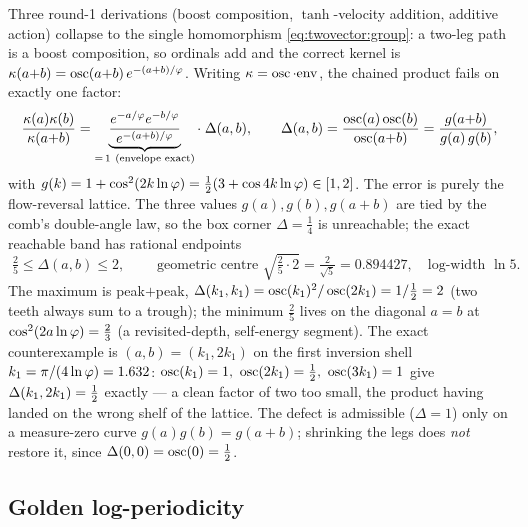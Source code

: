 Three round-1 derivations (boost composition, $\tanh$-velocity addition, additive action)
collapse to the single homomorphism \eqref{eq:twovector:group}: a two-leg path is a boost
composition, so ordinals add and the correct kernel is $\kappa(a{+}b)=\operatorname{osc}(a{+}b)\,e^{-(a+b)/\varphi}$.
Writing $\kappa=\operatorname{osc}\cdot\mathrm{env}$, the chained product fails on exactly one factor:
\begin{equation}
\frac{\kappa(a)\kappa(b)}{\kappa(a{+}b)}
=\underbrace{\frac{e^{-a/\phigr}e^{-b/\phigr}}{e^{-(a+b)/\phigr}}}_{=\,1\ (\text{envelope exact})}
\cdot\;\Delta(a,b),\qquad
\Delta(a,b)=\frac{\osc(a)\osc(b)}{\osc(a{+}b)}=\frac{g(a{+}b)}{g(a)\,g(b)},
\label{eq:twovector:defect}
\end{equation}
with $g(k)=1+\cos^2(2k\ln\varphi)=\tfrac12(3+\cos 4k\ln\varphi)\in[1,2]$. The error is purely the
flow-reversal lattice. The three values $g(a),g(b),g(a{+}b)$ are tied by the comb's double-angle
law, so the box corner $\Delta=\tfrac14$ is unreachable; the exact reachable band has rational
endpoints
\begin{equation}
\boxed{\;\tfrac25\le\Delta(a,b)\le2,\;}\qquad
\text{geometric centre }\sqrt{\tfrac25\cdot2}=\tfrac{2}{\sqrt5}=0.894427,\quad
\text{log-width }\ln5.
\label{eq:twovector:band}
\end{equation}
The maximum is peak$+$peak, $\Delta(k_1,k_1)=\operatorname{osc}(k_1)^2/\operatorname{osc}(2k_1)=1/\tfrac12=2$ (two teeth
always sum to a trough); the minimum $\tfrac25$ lives on the diagonal $a=b$ at
$\cos^2(2a\ln\varphi)=\tfrac23$ (a revisited-depth, self-energy segment). The exact counterexample
is $(a,b)=(k_1,2k_1)$ on the first inversion shell $k_1=\pi/(4\ln\varphi)=1.632$:
$\osc(k_1)=1,\ \osc(2k_1)=\half,\ \osc(3k_1)=1$ give $\Delta(k_1,2k_1)=\tfrac12$ exactly --- a clean
factor of two too small, the product having landed on the wrong shelf of the lattice. The defect
is admissible ($\Delta=1$) only on a measure-zero curve $g(a)g(b)=g(a{+}b)$; shrinking the legs
does \emph{not} restore it, since $\Delta(0,0)=\operatorname{osc}(0)=\tfrac12$.

\subsection{Golden log-periodicity}

